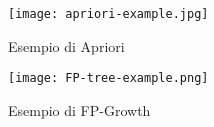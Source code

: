         \begin{figure}[h]
            \caption{Esempio di Apriori}
            \centering
            \texttt{[image: apriori-example.jpg]}
        \end{figure}

        \begin{figure}[h]
            \caption{Esempio di FP-Growth}
            \centering
            \texttt{[image: FP-tree-example.png]}
        \end{figure}

\clearpage